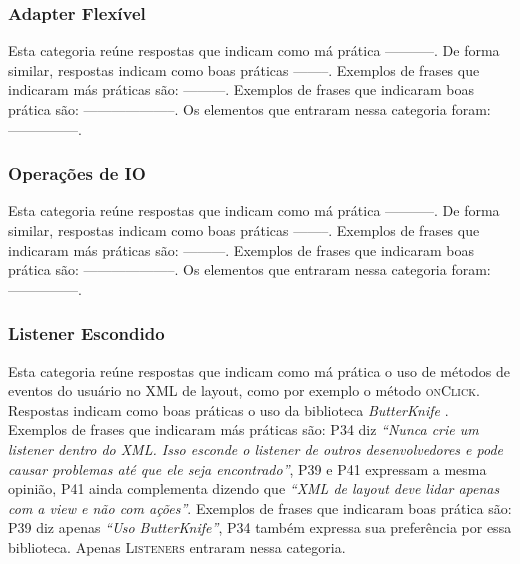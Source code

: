 \subsubsection{Adapter Flex\'ivel}
Esta categoria re\'une respostas que indicam como m\'a pr\'atica -----------. De forma similar, respostas indicam como boas pr\'aticas --------. Exemplos de frases que indicaram m\'as pr\'aticas s\~ao: ---------. Exemplos de frases que indicaram boas pr\'atica s\~ao: --------------------. Os elementos que entraram nessa categoria foram: ---------------. 


\subsubsection{Opera\c{c}\~oes de IO}
Esta categoria re\'une respostas que indicam como m\'a pr\'atica -----------. De forma similar, respostas indicam como boas pr\'aticas --------. Exemplos de frases que indicaram m\'as pr\'aticas s\~ao: ---------. Exemplos de frases que indicaram boas pr\'atica s\~ao: --------------------. Os elementos que entraram nessa categoria foram: ---------------. 

\subsubsection{Listener Escondido}
Esta categoria re\'une respostas que indicam como m\'a pr\'atica o uso de métodos de eventos do usuário no XML de layout, como por exemplo o método \textsc{onClick}. Respostas indicam como boas pr\'aticas o uso da biblioteca \textit{ButterKnife} \cite{ButterKnife}. Exemplos de frases que indicaram m\'as pr\'aticas s\~ao: P34 diz \textit{``Nunca crie um listener dentro do XML. Isso esconde o listener de outros desenvolvedores e pode causar problemas até que ele seja encontrado''}, P39 e P41 expressam a mesma opinião, P41 ainda complementa dizendo que \textit{``XML de layout deve lidar apenas com a view e não com ações''}. Exemplos de frases que indicaram boas pr\'atica s\~ao: P39 diz apenas \textit{``Uso ButterKnife''}, P34 também expressa sua preferência por essa biblioteca. Apenas \textsc{Listeners} entraram nessa categoria.










